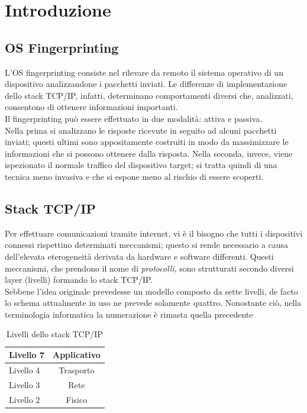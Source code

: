 

\chapter{Introduzione}
\label{introduzione}

\section{OS Fingerprinting}
\label{citazioni}

L'OS fingerprinting consiste nel rilevare da remoto il sistema operativo di un dispositivo analizzandone i pacchetti inviati. Le differenze di implementazione dello stack TCP/IP, infatti, determinano comportamenti diversi che, analizzati, consentono di ottenere informazioni importanti. \\
Il fingerprinting può essere effettuato in due modalità: attiva e passiva. \\ 
Nella prima si analizzano le risposte ricevute in seguito ad alcuni pacchetti inviati; questi ultimi sono appositamente costruiti in modo da massimizzare le informazioni che si possono ottenere dalla risposta.
Nella seconda, invece, viene ispezionato il normale traffico del dispositivo target; si tratta quindi di una tecnica meno invasiva e che si espone meno al rischio di essere scoperti.

\section{Stack TCP/IP}
Per effettuare comunicazioni tramite internet, vi è il bisogno che tutti i dispositivi connessi rispettino determinati meccanismi; questo si rende necessario a causa dell'elevata eterogeneità derivata da hardware e software differenti.
Questi meccanismi, che prendono il nome di \textit{protocolli}, sono strutturati secondo diversi layer (livelli) formando lo stack TCP/IP.  \\
Sebbene l'idea originale prevedesse un modello composto da sette livelli, de facto lo schema attualmente in uso ne prevede solamente quattro. Nonostante ciò, nella terminologia informatica la numerazione è rimasta quella precedente

\begin{table}[htb]
	\centering
	\begin{tabular}{| l | c |}
		\hline
		Livello 7 & Applicativo
		\\
		\hline
		Livello 4 & Trasporto
		\\
		\hline
		Livello 3 & Rete
		\\
		\hline
		Livello 2 & Fisico
		\\
		\hline

	\end{tabular}
	\caption{Livelli dello stack TCP/IP}
	\label{tab:stack}
\end{table}

